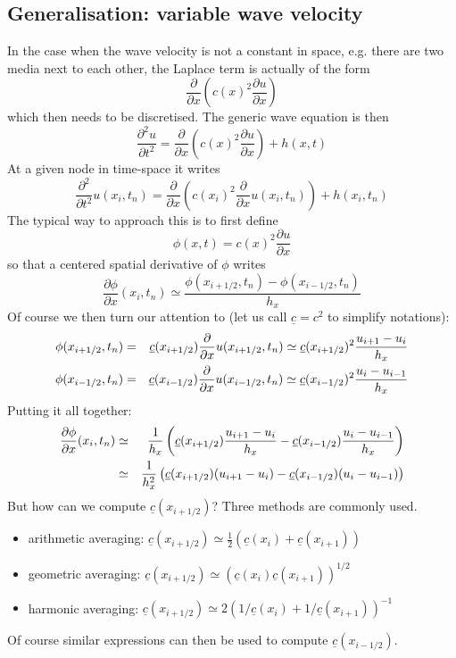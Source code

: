  


\subsection{Generalisation: variable wave velocity}


In the case when the wave velocity is not a constant in space,
e.g. there are two media next to each other,
the Laplace term is actually of the form
\[
\frac{\partial }{\partial x} (c(x)^2 \frac{\partial u}{\partial x})
\]
which then needs to be discretised. 
The generic wave equation is then 
\[
\frac{\partial^2  u}{\partial t^2} = 
\frac{\partial }{\partial x} (c(x)^2 \frac{\partial u}{\partial x})
+h(x,t)
\]
At a given node in time-space it writes
\[
\frac{\partial^2  }{\partial t^2} u(x_i,t_n)= 
\frac{\partial }{\partial x} \left(c(x_i)^2 \frac{\partial }{\partial x} u(x_i,t_n) \right)
+h(x_i,t_n)
\]
The typical way to approach this is to first define 
\[
\phi(x,t) = c(x)^2 \frac{\partial u}{\partial x}
\]
so that a centered spatial derivative of $\phi$ writes
\[
\frac{\partial \phi}{\partial x} (x_i,t_n) \simeq \frac{\phi(x_{i+1/2},t_n) - \phi(x_{i-1/2},t_n)}{h_x}  
\]
Of course we then turn our attention to (let us call $\underline{c}=c^2$ to simplify notations):
\begin{eqnarray}
\phi(x_{i+1/2},t_n) 
&=& \underline{c}(x_{i+1/2}) \frac{\partial }{\partial x} u(x_{i+1/2},t_n)
\simeq \underline{c}(x_{i+1/2})^2 \frac{u_{i+1} - u_i}{h_x} \nonumber\\
\phi(x_{i-1/2},t_n) 
&=& \underline{c}(x_{i-1/2}) \frac{\partial }{\partial x} u(x_{i-1/2},t_n)
\simeq \underline{c}(x_{i-1/2})^2 \frac{u_i - u_{i-1}}{h_x} 
\end{eqnarray}
Putting it all together:
\begin{eqnarray}
\frac{\partial \phi}{\partial x} (x_i,t_n) 
&\simeq &
\frac{1}{h_x} \left( \underline{c}(x_{i+1/2}) \frac{u_{i+1} - u_i}{h_x}
-\underline{c}(x_{i-1/2}) \frac{u_i - u_{i-1}}{h_x} 
\right) \nonumber\\
&\simeq &
\frac{1}{h_x^2} \left( \underline{c}(x_{i+1/2}) (u_{i+1} - u_i)
-\underline{c}(x_{i-1/2}) (u_i - u_{i-1})
\right) 
\end{eqnarray}
But how can we compute $\underline{c}(x_{i+1/2})$? Three methods are commonly used. 
\begin{itemize}
\item arithmetic averaging: $\underline{c}(x_{i+1/2}) \simeq \frac12 (\underline{c}(x_i)+\underline{c}(x_{i+1}))$
\item geometric averaging: $\underline{c}(x_{i+1/2}) \simeq (\underline{c}(x_i)\underline{c}(x_{i+1}))^{1/2}$
\item harmonic averaging: $\underline{c}(x_{i+1/2}) \simeq  2(1/\underline{c}(x_i)+1/\underline{c}(x_{i+1}))^{-1}$
\end{itemize}
Of course similar expressions can then be used to compute $\underline{c}(x_{i-1/2})$.



